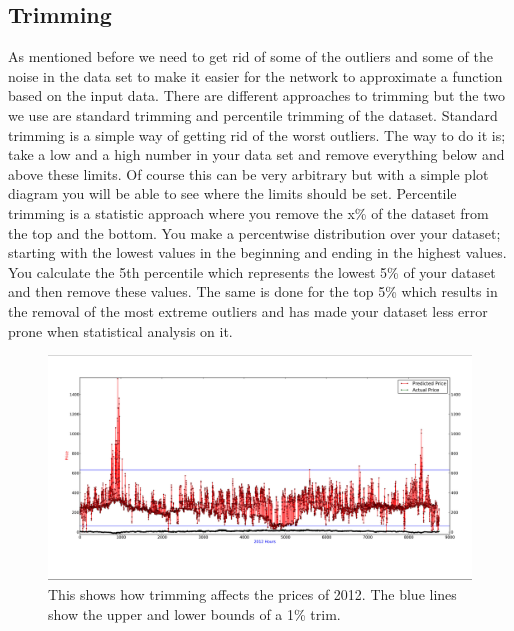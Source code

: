 \subsection{Trimming}\label{sec:Trimming}
As mentioned before we need to get rid of some of the outliers and some of the noise in the data set to make it easier for the network to approximate a function based on the input data. There are different approaches to trimming but the two we use are standard trimming and percentile trimming of the dataset. Standard trimming is a simple way of getting rid of the worst outliers. The way to do it is; take a low and a high number in your data set and remove everything below and above these limits. Of course this can be very arbitrary but with a simple plot diagram you will be able to see where the limits should be set. Percentile trimming is a statistic approach where you remove the x\% of the dataset from the top and the bottom. You make a percentwise distribution over your dataset; starting with the lowest values in the beginning and ending in the highest values. You calculate the 5th percentile which represents the lowest 5\% of your dataset and then remove these values. The same is done for the top 5\% which results in the removal of the most extreme outliers and has made your dataset less error prone when statistical analysis on it.
\begin{figure}[!ht]
\centering
\includegraphics[width=\linewidth,natwidth=898,natheight=587]{billeder/trimming_graph.jpg}
\caption{This shows how trimming affects the prices of 2012. The blue lines show the upper and lower bounds of a 1\% trim.}
\label{fig:weight_of_layers}
\end{figure}



